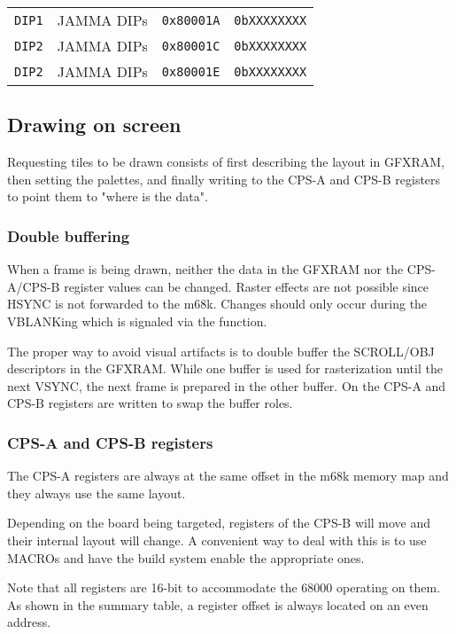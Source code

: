 \begin{tabularx}{\textwidth}{Xllr}
    \toprule   
    \texttt{DIP1} & JAMMA DIPs &  \texttt{0x80001A}    &  \texttt{0bXXXXXXXX}    \\      
    \texttt{DIP2} & JAMMA DIPs &  \texttt{0x80001C}    &  \texttt{0bXXXXXXXX}    \\      
    \texttt{DIP2} & JAMMA DIPs &  \texttt{0x80001E}    &  \texttt{0bXXXXXXXX}    \\      
  \toprule   
\end{tabularx}

\subsection{Drawing on screen}
Requesting tiles to be drawn consists of first describing the layout in GFXRAM, then setting the palettes, and finally writing to the CPS-A and CPS-B registers to point them to "where is the data".

\subsubsection{Double buffering}
When a frame is being drawn, neither the data in the GFXRAM nor the CPS-A/CPS-B register values can be changed. Raster effects are not possible since HSYNC is not forwarded to the m68k. Changes should only occur during the VBLANKing which is signaled via the  function.

The proper way to avoid visual artifacts is to double buffer the SCROLL/OBJ descriptors in the GFXRAM. While one buffer is used for rasterization until the next VSYNC, the next frame is prepared in the other buffer. On  the CPS-A and CPS-B registers are written to swap the buffer roles.

\subsubsection{CPS-A and CPS-B registers}
The CPS-A registers are always at the same offset in the m68k memory map and they always use the same layout. 

Depending on the board being targeted, registers of the CPS-B will move and their internal layout will change. A convenient way to deal with this is to use MACROs and have the build system enable the appropriate ones.

Note that all registers are 16-bit to accommodate the 68000 operating on them. As shown in the summary table, a register offset is always located on an even address.

